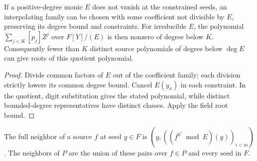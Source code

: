 \begin{theorem}
  \label{thm:lowerbounds-algebraic-condenser-quotient}
  \leanok
  If a positive-degree monic $E$ does not vanish at the constrained
  seeds, an interpolating family can be chosen with some coefficient
  not divisible by $E$, preserving its degree bound and constraints.
  For irreducible $E$, the polynomial
  $\sum_{j<K}[p_j]Z^j$ over $F[Y]/(E)$ is then nonzero of degree
  below $K$. Consequently fewer than $K$ distinct source polynomials
  of degree below $\deg E$ can give roots of this quotient polynomial.
\end{theorem}
\begin{proof}
  \leanok
  Divide common factors of $E$ out of the coefficient family; each
  division strictly lowers its common degree bound. Cancel $E(y_x)$
  in each constraint. In the quotient, digit substitution gives the
  stated polynomial, while distinct bounded-degree representatives
  have distinct classes. Apply the field root bound.
\end{proof}

\begin{definition}
  \label{def:lowerbounds-algebraic-condenser-neighbors}
  \leanok
  The full neighbor of a source $f$ at seed $y\in F$ is
  $(y,((f^{h^i}\bmod E)(y))_{i<m})$. The neighbors of $P$ are the
  union of these pairs over $f\in P$ and every seed in $F$.
\end{definition}

